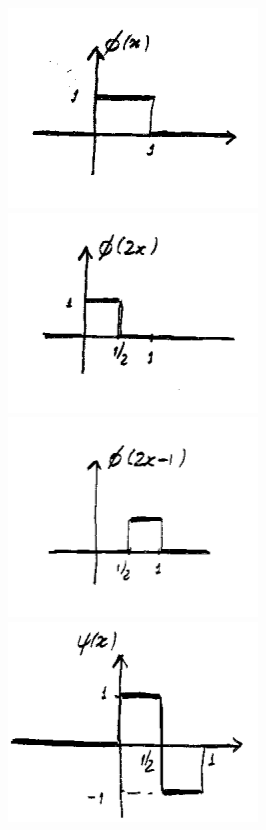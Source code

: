 \begin{figure}[htb]
  \centering
  \includegraphics{figuras/07-1}
  \includegraphics{figuras/07-2}
  \includegraphics{figuras/07-3}\\
  \includegraphics{figuras/07-4}
\end{figure}

